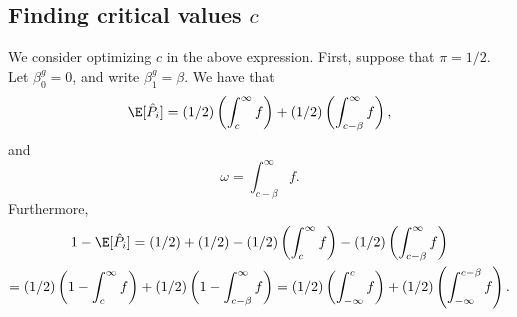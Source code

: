 \documentclass[12pt]{article}
\begin{document}
\subsection{Finding critical values $c$}

We consider optimizing $c$ in the above expression. First, suppose that $\pi = 1/2$. Let $\beta_0^g = 0$, and write $\beta_1^g = \beta.$ We have that
$$ \E[\hat{P}_i] = (1/2) \left( \int_{c}^{\infty} f \right) + (1/2)\left( \int_{c - \beta}^{\infty} f \right),$$ and $$ \omega =  \int_{c - \beta}^{\infty} f.$$ Furthermore,
\begin{multline*}
1 - \E[\hat{P}_i] = (1/2) + (1/2) - (1/2) \left( \int_{c}^{\infty} f \right) - (1/2)\left( \int_{c - \beta}^{\infty} f \right) \\ = (1/2) \left( 1 - \int_c^{\infty} f \right) + (1/2) \left( 1 - \int_{c - \beta}^\infty f \right) = (1/2) \left( \int_{-\infty}^c f \right) + (1/2) \left( \int_{-\infty}^{c - \beta} f \right).
\end{multline*}
\end{document}
